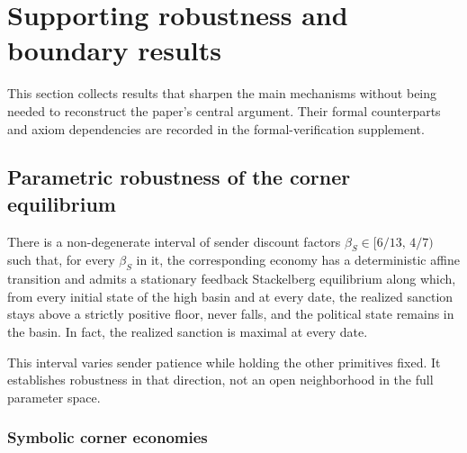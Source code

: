 \section{Supporting robustness and boundary results}
\label{app:supporting-results}

This section collects results that sharpen the main mechanisms without
being needed to reconstruct the paper's central argument. Their formal
counterparts and axiom dependencies are recorded in the formal-verification
supplement.

\subsection{Parametric robustness of the corner equilibrium}

\begin{proposition}
\label{prop:perpetual-interval}
There is a non-degenerate interval of sender discount factors
$\beta_S\in[6/13,\,4/7)$ such that, for every $\beta_S$ in it, the
corresponding economy has a deterministic affine transition and admits a
stationary feedback Stackelberg equilibrium along which, from every initial state
of the high basin and at every date, the realized sanction stays above a
strictly positive floor, never falls, and the political state remains in
the basin. In fact, the realized sanction is maximal at every date.
\end{proposition}

This interval varies sender patience while holding the other primitives
fixed. It establishes robustness in that direction, not an open
neighborhood in the full parameter space.

\subsubsection{Symbolic corner economies}
\label{sec:existence:symbolic-family}


